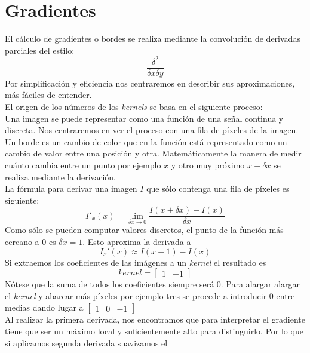 \section{Gradientes}
El cálculo de gradientes o bordes se realiza mediante la convolución
de derivadas parciales del estilo:
\begin{equation*}
  \frac{\delta^{2}}{\delta x \delta y}
\end{equation*}
Por simplificación y eficiencia nos centraremos en describir sus
aproximaciones, más fáciles de entender. \\
El origen de los números de los \emph{kernels} se basa en el siguiente
proceso:\\
Una imagen se puede representar como una función de una señal continua y
discreta. Nos centraremos en ver el proceso con una fila de píxeles de
la imagen. Un borde es un cambio de color que en la función está
representado como un cambio de valor entre una posición y
otra. Matemáticamente la manera de medir cuánto cambia entre un punto
por ejemplo $x$ y otro muy próximo $x + \delta x$ se realiza mediante la
derivación.\\
La fórmula para derivar una imagen $I$ que sólo contenga una fila de
píxeles es siguiente:
\begin{equation*}
I'_x(x) = \lim_{\delta x \to 0}\frac{I(x+\delta x) - I(x)}{\delta x}
\end{equation*}
Como sólo se pueden computar valores discretos, el punto de la función
más cercano a $0$ es $\delta x = 1$. Esto aproxima la derivada a
\begin{equation*}
I_x'(x) \approx I(x + 1) - I(x)
\end{equation*}
Si extraemos los coeficientes de las imágenes a un \emph{kernel} el
resultado es
\begin{equation*}
kernel = \begin{bmatrix}
1 & -1
\end{bmatrix}
\end{equation*}
Nótese que la suma de todos los coeficientes siempre será $0$. Para
alargar alargar el \emph{kernel} y abarcar más píxeles por ejemplo
tres se procede a introducir $0$ entre medias dando lugar a
$\begin{bmatrix} 1 & 0 & -1 \end{bmatrix}$ \\
Al realizar la primera derivada, nos encontramos que para interpretar
el gradiente tiene que ser un máximo local y suficientemente alto para
distinguirlo. Por lo que si aplicamos segunda derivada suavizamos el
